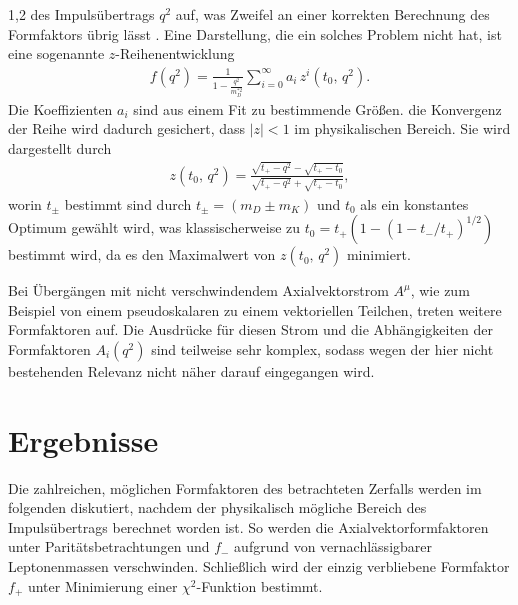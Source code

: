 \documentclass[11pt,a4paper,twoside]{report}
\begin{document}
\begin{spacing}{1,2}
des Impulsübertrags $q^2$ auf, was Zweifel an einer korrekten Berechnung des Formfaktors übrig lässt \cite{PhysRev_Data}. Eine Darstellung, die ein solches Problem nicht hat,
ist eine sogenannte $z$-Reihenentwicklung \cite{formfactor_PhysRev}
\begin{align}
 f(q^2) = \frac{1}{1-\frac{q^2}{m^{*2}_D}} \sum\limits_{i=0}^\infty a_i\,z^i(t_0,\, q^2).
 \label{eq_formparam}
\end{align}
Die Koeffizienten $a_i$ sind
aus einem Fit zu bestimmende Größen. die Konvergenz der Reihe wird dadurch gesichert, dass $|z|<1$ im physikalischen Bereich. Sie wird dargestellt durch
\begin{align}
 z(t_0,\, q^2)= \frac{\sqrt{t_+-q^2}-\sqrt{t_+-t_0}}{\sqrt{t_+-q^2}+\sqrt{t_+-t_0}},
 \label{eq_zexpansion}
\end{align}
worin $t_\pm$ bestimmt sind durch $t_\pm = (m_D \pm m_K)$ und $t_0$ als ein konstantes Optimum gewählt wird, was klassischerweise zu 
$t_0 = t_+(1-(1-t_-/t_+)^{1/2})$ bestimmt wird, da es den Maximalwert von $z(t_0,\, q^2)$ minimiert.

\noindent
Bei Übergängen mit nicht verschwindendem Axialvektorstrom $A^\mu$, wie zum Beispiel von einem pseudoskalaren zu einem vektoriellen Teilchen, treten 
weitere Formfaktoren auf. Die Ausdrücke für diesen Strom und die Abhängigkeiten der Formfaktoren $A_i(q^2)$ sind teilweise sehr komplex, sodass wegen
der hier nicht bestehenden Relevanz nicht näher darauf eingegangen wird.

\chapter{Ergebnisse}
Die zahlreichen, möglichen Formfaktoren des betrachteten Zerfalls werden im folgenden diskutiert, nachdem der physikalisch mögliche Bereich des Impulsübertrags
berechnet worden ist. So werden die Axialvektorformfaktoren unter Paritätsbetrachtungen und $f_-$ aufgrund von vernachlässigbarer Leptonenmassen verschwinden.
Schließlich wird der einzig verbliebene Formfaktor $f_+$ unter Minimierung einer $\chi^2$-Funktion bestimmt.

\end{spacing}
\end{document}
